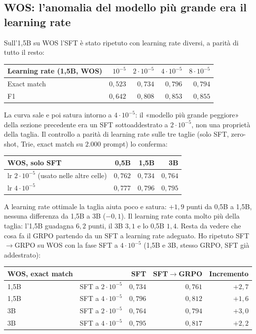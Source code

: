 \subsection{WOS: l'anomalia del modello più grande era il learning rate}
\label{sec:wos-lr}

Sull'1,5B su WOS l'SFT è stato ripetuto con learning rate diversi, a parità di
tutto il resto:

\begin{center}
\small
\begin{tabular}{lrrrr}
\toprule
Learning rate (1,5B, WOS) & $10^{-5}$ & $2\cdot 10^{-5}$ & $4\cdot 10^{-5}$ & $8\cdot 10^{-5}$ \\
\midrule
Exact match & $0{,}523$ & $0{,}734$ & $0{,}796$ & $0{,}794$ \\
F1 & $0{,}642$ & $0{,}808$ & $0{,}853$ & $0{,}855$ \\
\bottomrule
\end{tabular}
\end{center}

La curva sale e poi satura intorno a $4\cdot 10^{-5}$: il «modello più grande
peggiore» della sezione precedente era un SFT sottoaddestrato a $2\cdot
10^{-5}$, non una proprietà della taglia. Il controllo a parità di learning rate
sulle tre taglie (solo SFT, zero-shot, Trie, exact match su $2.000$ prompt)
lo conferma:

\begin{center}
\small
\begin{tabular}{lrrr}
\toprule
WOS, solo SFT & 0,5B & 1,5B & 3B \\
\midrule
lr $2\cdot 10^{-5}$ (usato nelle altre celle) & $0{,}762$ & $0{,}734$ & $0{,}764$ \\
lr $4\cdot 10^{-5}$                           & $0{,}777$ & $0{,}796$ & $0{,}795$ \\
\bottomrule
\end{tabular}
\end{center}

A learning rate ottimale la taglia aiuta poco e satura: $+1{,}9$ punti da 0,5B
a 1,5B, nessuna differenza da 1,5B a 3B ($-0{,}1$). Il learning rate conta molto
più della taglia: l'1,5B guadagna $6{,}2$ punti, il 3B $3{,}1$ e lo 0,5B
$1{,}4$. Resta da vedere che cosa fa il GRPO partendo da un SFT a learning rate
adeguato. Ho ripetuto SFT$\to$GRPO su WOS con la fase SFT a $4\cdot 10^{-5}$ (1,5B
e 3B, stesso GRPO, SFT già addestrato):

\begin{center}
\small
\begin{tabular}{llrrr}
\toprule
WOS, exact match & & SFT & SFT$\to$GRPO & Incremento \\
\midrule
1,5B & SFT a $2\cdot 10^{-5}$ & $0{,}734$ & $0{,}761$ & $+2{,}7$ \\
1,5B & SFT a $4\cdot 10^{-5}$ & $0{,}796$ & $0{,}812$ & $+1{,}6$ \\
3B   & SFT a $2\cdot 10^{-5}$ & $0{,}764$ & $0{,}794$ & $+3{,}0$ \\
3B   & SFT a $4\cdot 10^{-5}$ & $0{,}795$ & $0{,}817$ & $+2{,}2$ \\
\bottomrule
\end{tabular}
\end{center}

